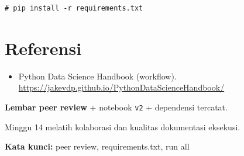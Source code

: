 \documentclass[../main.tex]{subfiles}
\begin{document}
\begin{lstlisting}[caption=Perintah shell membantu rekan]
# pip install -r requirements.txt
\end{lstlisting}

\section{Referensi}

\begin{itemize}[leftmargin=*]
  \item Python Data Science Handbook (workflow). \url{https://jakevdp.github.io/PythonDataScienceHandbook/}
\end{itemize}

\begin{asesmen}
\textbf{Lembar peer review} + notebook \texttt{v2} + dependensi tercatat.
\end{asesmen}

\begin{rangkuman}
Minggu 14 melatih kolaborasi dan kualitas dokumentasi eksekusi.

\textbf{Kata kunci:} peer review, requirements.txt, run all
\end{rangkuman}
\end{document}
